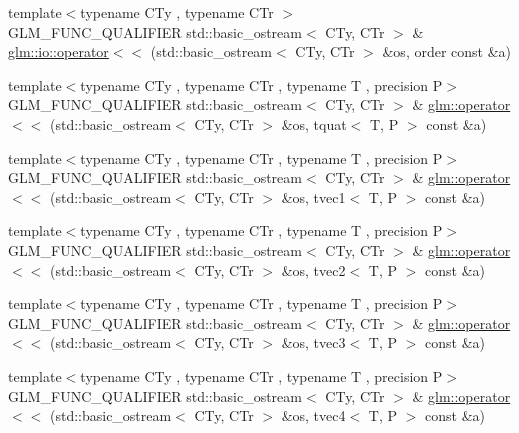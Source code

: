 \begin{DoxyCompactItemize}
\item 
{\footnotesize template$<$typename C\+Ty , typename C\+Tr $>$ }\\G\+L\+M\+\_\+\+F\+U\+N\+C\+\_\+\+Q\+U\+A\+L\+I\+F\+I\+E\+R std\+::basic\+\_\+ostream$<$ C\+Ty, C\+Tr $>$ \& \hyperlink{namespaceglm_1_1io_a4dab7c825ecbd918643ed9fc9ef4ecb6}{glm\+::io\+::operator$<$$<$} (std\+::basic\+\_\+ostream$<$ C\+Ty, C\+Tr $>$ \&os, order const \&a)
\item 
{\footnotesize template$<$typename C\+Ty , typename C\+Tr , typename T , precision P$>$ }\\G\+L\+M\+\_\+\+F\+U\+N\+C\+\_\+\+Q\+U\+A\+L\+I\+F\+I\+E\+R std\+::basic\+\_\+ostream$<$ C\+Ty, C\+Tr $>$ \& \hyperlink{group__gtx__io_ga038d37e8d7965dc7bfae5dc23e4140af}{glm\+::operator$<$$<$} (std\+::basic\+\_\+ostream$<$ C\+Ty, C\+Tr $>$ \&os, tquat$<$ T, P $>$ const \&a)
\item 
{\footnotesize template$<$typename C\+Ty , typename C\+Tr , typename T , precision P$>$ }\\G\+L\+M\+\_\+\+F\+U\+N\+C\+\_\+\+Q\+U\+A\+L\+I\+F\+I\+E\+R std\+::basic\+\_\+ostream$<$ C\+Ty, C\+Tr $>$ \& \hyperlink{group__gtx__io_ga171289d1671b75e033a1b078c68a7460}{glm\+::operator$<$$<$} (std\+::basic\+\_\+ostream$<$ C\+Ty, C\+Tr $>$ \&os, tvec1$<$ T, P $>$ const \&a)
\item 
{\footnotesize template$<$typename C\+Ty , typename C\+Tr , typename T , precision P$>$ }\\G\+L\+M\+\_\+\+F\+U\+N\+C\+\_\+\+Q\+U\+A\+L\+I\+F\+I\+E\+R std\+::basic\+\_\+ostream$<$ C\+Ty, C\+Tr $>$ \& \hyperlink{group__gtx__io_ga0a3bca262adbba991f394d8d3d52e10d}{glm\+::operator$<$$<$} (std\+::basic\+\_\+ostream$<$ C\+Ty, C\+Tr $>$ \&os, tvec2$<$ T, P $>$ const \&a)
\item 
{\footnotesize template$<$typename C\+Ty , typename C\+Tr , typename T , precision P$>$ }\\G\+L\+M\+\_\+\+F\+U\+N\+C\+\_\+\+Q\+U\+A\+L\+I\+F\+I\+E\+R std\+::basic\+\_\+ostream$<$ C\+Ty, C\+Tr $>$ \& \hyperlink{group__gtx__io_ga0d6cfb5d138639b90f18d7bbb2a4ae56}{glm\+::operator$<$$<$} (std\+::basic\+\_\+ostream$<$ C\+Ty, C\+Tr $>$ \&os, tvec3$<$ T, P $>$ const \&a)
\item 
{\footnotesize template$<$typename C\+Ty , typename C\+Tr , typename T , precision P$>$ }\\G\+L\+M\+\_\+\+F\+U\+N\+C\+\_\+\+Q\+U\+A\+L\+I\+F\+I\+E\+R std\+::basic\+\_\+ostream$<$ C\+Ty, C\+Tr $>$ \& \hyperlink{group__gtx__io_ga948ab426a879f24236d8978ee9b5fade}{glm\+::operator$<$$<$} (std\+::basic\+\_\+ostream$<$ C\+Ty, C\+Tr $>$ \&os, tvec4$<$ T, P $>$ const \&a)

\end{DoxyCompactItemize}
